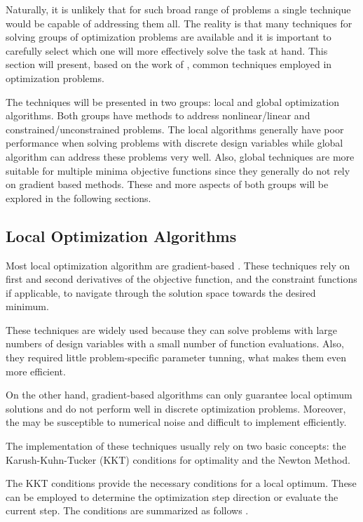 Naturally, it is unlikely that for such broad range of problems a single technique would be capable of addressing them all. The reality is that many techniques for solving groups of optimization problems are available and it is important to carefully select which one will more effectively solve the task at hand. This section will present, based on the work of , common techniques employed in optimization problems. 

The techniques will be presented in two groups: local and global optimization algorithms. Both groups have methods to address nonlinear/linear and constrained/unconstrained problems. The local algorithms generally have poor performance when solving problems with discrete design variables while global algorithm can address these problems very well. Also, global techniques are more suitable for multiple minima objective functions since they generally do not rely on gradient based methods. These and more aspects of both groups will be explored in the following sections.

\subsection{Local Optimization Algorithms}

Most local optimization algorithm are gradient-based \cite{Venter}. These techniques rely on first and second derivatives of the objective function, and the constraint functions if applicable, to navigate through the solution space towards the desired minimum. 

These techniques are widely used because they can solve problems with large numbers of design variables with a small number of function evaluations. Also, they required little problem-specific parameter tunning, what makes them even more efficient. 

On the other hand, gradient-based algorithms can only guarantee local optimum solutions and do not perform well in discrete optimization problems. Moreover, the may be susceptible to numerical noise and difficult to implement efficiently. 

The implementation of these techniques usually rely on two basic concepts: the Karush-Kuhn-Tucker (KKT) conditions for optimality and the Newton Method.

The KKT conditions provide the necessary conditions for a local optimum. These can be employed to determine the optimization step direction or evaluate the current step.  The conditions are summarized as follows \cite{Venter}.

